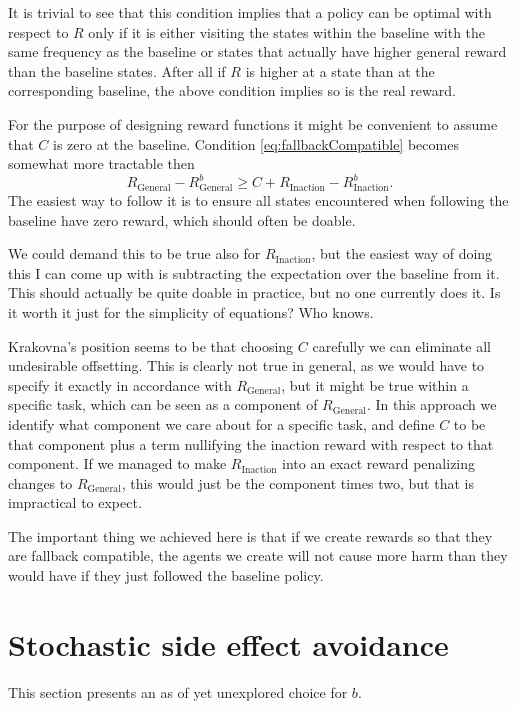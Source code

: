 \documentclass{article}
\newcommand{\rewardFunction}{R}
\newcommand{\generalRewardFunction}{\rewardFunction_{\mathrm{General}}}
\newcommand{\inactionRewardFunction}{\rewardFunction_{\mathrm{Inaction}}}
\newcommand{\corruption}{C}
\newcommand{\baseline}{b}
\begin{document}
		It is trivial to see that this condition implies that a policy can be optimal with respect to
		$\rewardFunction$ only if it is either visiting the states within the baseline with the same
		frequency as the baseline	or states that actually have higher general reward than the baseline
		states. After all if $\rewardFunction$ is higher at a state than at the corresponding baseline,
		the above condition implies so is the real reward.

		For the purpose of designing reward functions it might be convenient to assume
		that $\corruption$ is zero at the baseline. Condition \eqref{eq:fallbackCompatible}
		becomes somewhat more tractable then
		\begin{equation*}
				\generalRewardFunction - \generalRewardFunction^\baseline \geq
				\corruption + \inactionRewardFunction - \inactionRewardFunction^\baseline.
		\end{equation*}
		The easiest way to follow it is to ensure all states encountered
		when following the baseline have zero reward, which should often be doable.

		We could demand this to be true also for $\inactionRewardFunction$, but the easiest way of
		doing this I can come up with is subtracting the expectation over the baseline from it.
		This should actually be quite doable in practice, but no one currently does it.
		Is it worth it just for the simplicity of equations? Who knows.

		Krakovna's position seems to be that choosing $\corruption$ carefully we can eliminate
		all undesirable offsetting. This is clearly not true in general, as we would have to specify
		it exactly in accordance with $\generalRewardFunction$, but it might be true within
		a specific task, which can be seen as a component of $\generalRewardFunction$. In this
		approach we identify what component we care about for a specific task, and define
		$\corruption$ to be that component plus a term nullifying the inaction reward
		with respect to that component. If we managed to make $\inactionRewardFunction$
		into an exact reward penalizing changes to $\generalRewardFunction$, this would just be
		the component times two, but that is impractical to expect.

		The important thing we achieved here is that if we create rewards so that they are fallback
		compatible, the agents we create will not cause more harm than they would have if they
		just followed the baseline policy.

\section{Stochastic side effect avoidance}
	This section presents an as of yet unexplored choice for $\baseline$.
\end{document}
